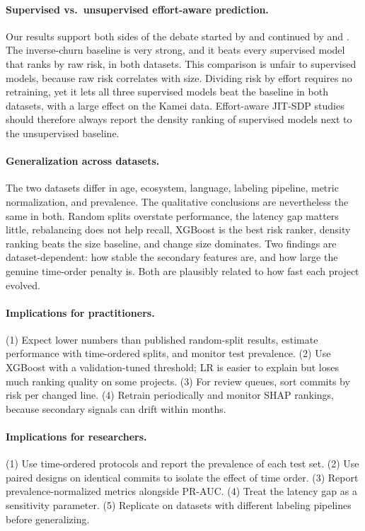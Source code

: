 \documentclass[11pt,a4paper]{article}
\begin{document}
\paragraph{Supervised vs.\ unsupervised effort-aware prediction.} Our results support both sides of the debate started by \citet{yang2016} and continued by \citet{fu2017} and \citet{huang2019}. The inverse-churn baseline is very strong, and it beats every supervised model that ranks by raw risk, in both datasets. This comparison is unfair to supervised models, because raw risk correlates with size. Dividing risk by effort requires no retraining, yet it lets all three supervised models beat the baseline in both datasets, with a large effect on the Kamei data. Effort-aware JIT-SDP studies should therefore always report the density ranking of supervised models next to the unsupervised baseline.

\paragraph{Generalization across datasets.} The two datasets differ in age, ecosystem, language, labeling pipeline, metric normalization, and prevalence. The qualitative conclusions are nevertheless the same in both. Random splits overstate performance, the latency gap matters little, rebalancing does not help recall, XGBoost is the best risk ranker, density ranking beats the size baseline, and change size dominates. Two findings are dataset-dependent: how stable the secondary features are, and how large the genuine time-order penalty is. Both are plausibly related to how fast each project evolved.

\paragraph{Implications for practitioners.} (1) Expect lower numbers than published random-split results, estimate performance with time-ordered splits, and monitor test prevalence. (2) Use XGBoost with a validation-tuned threshold; LR is easier to explain but loses much ranking quality on some projects. (3) For review queues, sort commits by risk per changed line. (4) Retrain periodically and monitor SHAP rankings, because secondary signals can drift within months.

\paragraph{Implications for researchers.} (1) Use time-ordered protocols and report the prevalence of each test set. (2) Use paired designs on identical commits to isolate the effect of time order. (3) Report prevalence-normalized metrics alongside PR-AUC. (4) Treat the latency gap as a sensitivity parameter. (5) Replicate on datasets with different labeling pipelines before generalizing.
\end{document}
